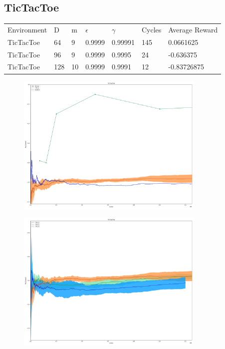 \documentclass{article}
\theoremstyle{definition}
\newtheorem{primary statistics}[definition]{Primary Statistics}
\newtheorem{auxiliary statistics}[definition]{Auxiliary Statistics}
\begin{document}

\newpage

\subsection{TicTacToe}
\begin{tabular}{lllllll}
 \centering
Environment & D & m & $\epsilon$ & $\gamma$ & Cycles & Average Reward \\
TicTacToe   & 64        & 9           & 0.9999      & 0.99991           & 145    & 0.0661625         \\
TicTacToe   & 96        & 9           & 0.9999      & 0.9995            & 24     & -0.636375         \\
TicTacToe   & 128       & 10          & 0.9999      & 0.9991            & 12     & -0.83726875        
\end{tabular}


 \begin{figure}[h]
 \centering
    \includegraphics[width=9cm]{RvVvU_TicTacToe}
\end{figure}

 \begin{figure}[h]
 \centering
    \includegraphics[width=9cm]{BT_TicTacToe}
\end{figure}
\end{document}
